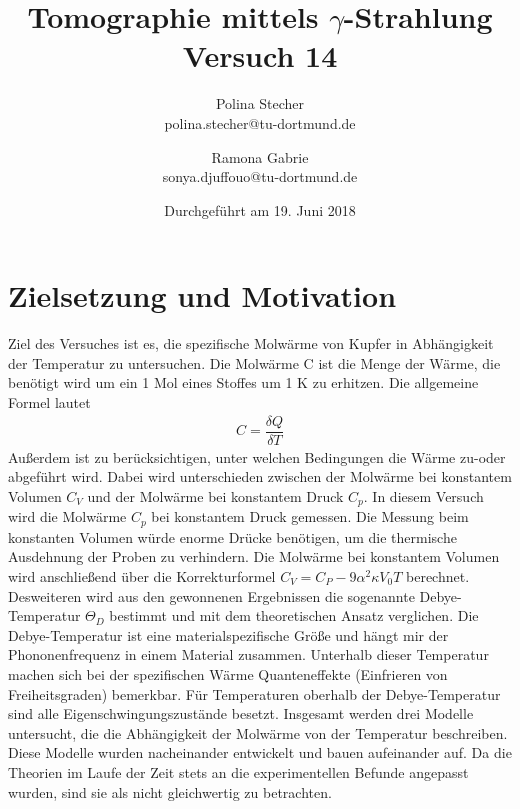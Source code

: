 \documentclass{article}
\begin{document}
	\scriptsize \normalsize
	\title{ Tomographie mittels $\gamma$-Strahlung  \\ Versuch 14}
	

	
	\author{Polina Stecher\\ {polina.stecher@tu-dortmund.de}  \and   Ramona Gabrie\\ {sonya.djuffouo@tu-dortmund.de}} %
	\date{Durchgeführt am  19. Juni  2018}
		\maketitle
	\newpage
	\tableofcontents
	\thispagestyle{empty}
	\newpage
	\newpage
	
\section{Zielsetzung und Motivation}
Ziel des Versuches ist es, die spezifische Molwärme von Kupfer in Abhängigkeit der Temperatur zu untersuchen. Die Molwärme C ist die Menge der Wärme, die benötigt wird um ein 1 Mol eines Stoffes um 1 K zu erhitzen. Die  allgemeine Formel  lautet 
\begin{align}
C=\dfrac{\delta Q}{\delta T}
\end{align} 
Außerdem ist zu berücksichtigen, unter welchen Bedingungen die Wärme zu-oder abgeführt wird. Dabei wird unterschieden zwischen der Molwärme bei konstantem Volumen $C_V$ und der Molwärme bei konstantem Druck $C_p$. In diesem Versuch wird die Molwärme $C_p$ bei konstantem Druck gemessen. Die Messung beim konstanten Volumen würde enorme Drücke benötigen, um die thermische Ausdehnung der Proben zu verhindern. Die Molwärme bei konstantem Volumen wird anschließend über die Korrekturformel $C_V=C_P-9\alpha^2\kappa V_0T$ berechnet. Desweiteren wird aus den gewonnenen Ergebnissen die sogenannte Debye-Temperatur  $\Theta_D$ bestimmt und mit dem theoretischen Ansatz verglichen. Die Debye-Temperatur ist eine materialspezifische Größe und hängt mir der Phononenfrequenz in einem Material zusammen. Unterhalb dieser Temperatur machen sich bei der spezifischen Wärme Quanteneffekte (Einfrieren von Freiheitsgraden) bemerkbar. Für Temperaturen oberhalb der Debye-Temperatur sind alle Eigenschwingungszustände besetzt. Insgesamt werden drei Modelle untersucht, die die Abhängigkeit der Molwärme von der Temperatur beschreiben. Diese Modelle wurden nacheinander entwickelt und bauen aufeinander auf.
Da die Theorien im Laufe der Zeit stets an die experimentellen Befunde angepasst wurden, sind sie als nicht gleichwertig zu betrachten. 
\end{document}
